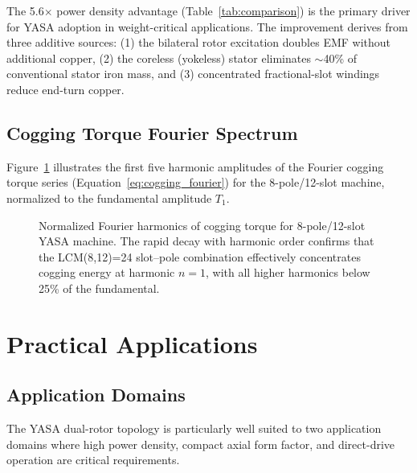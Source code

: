 \documentclass[12pt,a4paper]{article}
\begin{document}
The 5.6$\times$ power density advantage (Table~\ref{tab:comparison}) is the primary driver for YASA adoption in weight-critical applications. The improvement derives from three additive sources: (1) the bilateral rotor excitation doubles EMF without additional copper, (2) the coreless (yokeless) stator eliminates $\sim$40\% of conventional stator iron mass, and (3) concentrated fractional-slot windings reduce end-turn copper.

\subsection{Cogging Torque Fourier Spectrum}
Figure~\ref{fig:cogging} illustrates the first five harmonic amplitudes of the Fourier cogging torque series (Equation~\ref{eq:cogging_fourier}) for the 8-pole/12-slot machine, normalized to the fundamental amplitude $T_1$.

\begin{figure}[!htbp]
\centering
{}
\caption{Normalized Fourier harmonics of cogging torque for 8-pole/12-slot YASA machine. The rapid decay with harmonic order confirms that the LCM(8,12)=24 slot--pole combination effectively concentrates cogging energy at harmonic $n=1$, with all higher harmonics below 25\% of the fundamental.}
\label{fig:cogging}
\end{figure}

\section{Practical Applications}

\subsection{Application Domains}
The YASA dual-rotor topology is particularly well suited to two application domains where high power density, compact axial form factor, and direct-drive operation are critical requirements.
\end{document}
